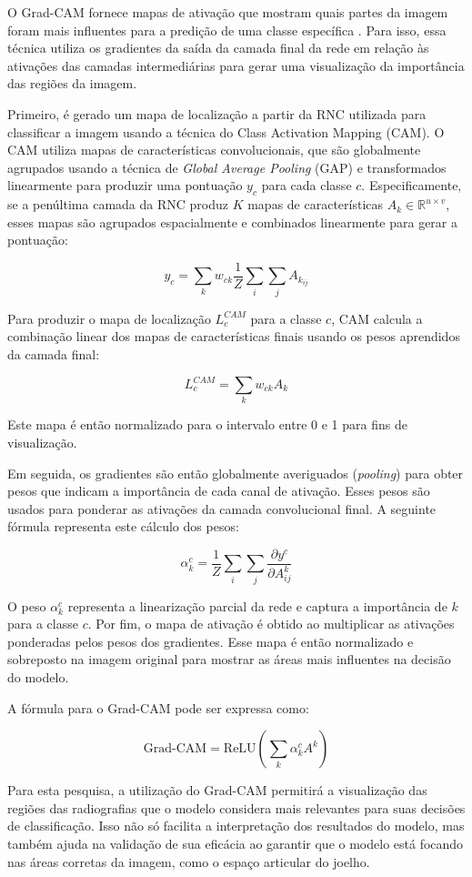 O Grad-CAM fornece mapas de ativação que mostram quais partes da imagem foram mais influentes para a predição de uma classe específica \cite{Selvaraju2016}. Para isso, essa técnica utiliza os gradientes da saída da camada final da rede em relação às ativações das camadas intermediárias para gerar uma visualização da importância das regiões da imagem.

Primeiro, é gerado um mapa de localização a partir da RNC utilizada para classificar a imagem usando a técnica do Class Activation Mapping (CAM). O CAM utiliza mapas de características convolucionais, que são globalmente agrupados usando a técnica de \textit{Global Average Pooling} (GAP) e transformados linearmente para produzir uma pontuação \( y_c \) para cada classe \( c \). Especificamente, se a penúltima camada da RNC produz \( K \) mapas de características \( A_k \in \mathbb{R}^{u \times v} \), esses mapas são agrupados espacialmente e combinados linearmente para gerar a pontuação:

\[
y_c = \sum_k w_{ck} \frac{1}{Z} \sum_i \sum_j A_{k_{ij}}
\]

Para produzir o mapa de localização \( L_c^{CAM} \) para a classe \( c \), CAM calcula a combinação linear dos mapas de características finais usando os pesos aprendidos da camada final:

\[
L_c^{CAM} = \sum_k w_{ck} A_k
\]

Este mapa é então normalizado para o intervalo entre 0 e 1 para fins de visualização.

Em seguida, os gradientes são então globalmente averiguados (\textit{pooling}) para obter pesos que indicam a importância de cada canal de ativação. Esses pesos são usados para ponderar as ativações da camada convolucional final. A seguinte fórmula representa este cálculo dos pesos:

\[
\alpha_{k}^{c} = \frac{1}{Z} \sum_i \sum_j \frac{\partial y^{c}}{\partial A_{ij}^{k}}
\]

O peso \( \alpha_{k}^{c} \) representa a linearização parcial da rede e captura a importância de \(k \) para a classe \(c \). Por fim, o mapa de ativação é obtido ao multiplicar as ativações ponderadas pelos pesos dos gradientes. Esse mapa é então normalizado e sobreposto na imagem original para mostrar as áreas mais influentes na decisão do modelo.

A fórmula para o Grad-CAM pode ser expressa como:

\[
\text{Grad-CAM} = \text{ReLU} \left( \sum_{k} \alpha_{k}^{c} A^{k} \right)
\]

Para esta pesquisa, a utilização do Grad-CAM permitirá a visualização das regiões das radiografias que o modelo considera mais relevantes para suas decisões de classificação. Isso não só facilita a interpretação dos resultados do modelo, mas também ajuda na validação de sua eficácia ao garantir que o modelo está focando nas áreas corretas da imagem, como o espaço articular do joelho.